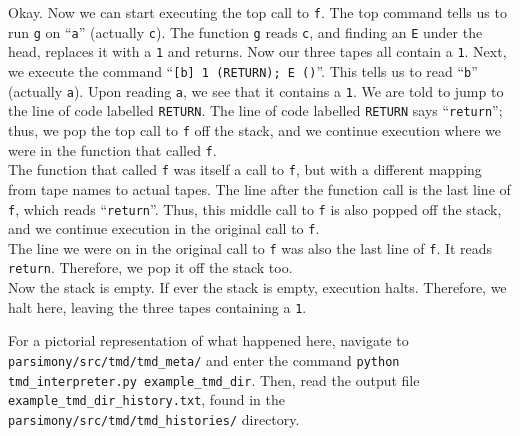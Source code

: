 \documentclass[11pt]{article}
\begin{document}
Okay. Now we can start executing the top call to \texttt{f}. The top command tells us to run \texttt{g} on ``\texttt{a}'' (actually \texttt{c}). The function \texttt{g} reads \texttt{c}, and finding an \texttt{E} under the head, replaces it with a \texttt{1} and returns. Now our three tapes all contain a \texttt{1}. Next, we execute the command ``\texttt{[b] 1 (RETURN); E ()}''. This tells us to read ``\texttt{b}'' (actually \texttt{a}). Upon reading \texttt{a}, we see that it contains a \texttt{1}. We are told to jump to the line of code labelled \texttt{RETURN}. The line of code labelled \texttt{RETURN} says ``\texttt{return}''; thus, we pop the top call to \texttt{f} off the stack, and we continue execution where we were in the function that called \texttt{f}. \\

The function that called \texttt{f} was itself a call to \texttt{f}, but with a different mapping from tape names to actual tapes. The line after the function call is the last line of \texttt{f}, which reads ``\texttt{return}''. Thus, this middle call to \texttt{f} is also popped off the stack, and we continue execution in the original call to \texttt{f}. \\

The line we were on in the original call to \texttt{f} was also the last line of \texttt{f}. It reads \texttt{return}. Therefore, we pop it off the stack too. \\

Now the stack is empty. If ever the stack is empty, execution halts. Therefore, we halt here, leaving the three tapes containing a \texttt{1}.

For a pictorial representation of what happened here, navigate to \texttt{parsimony/src/tmd/tmd\_meta/} and enter the command \texttt{python tmd\_interpreter.py example\_tmd\_dir}. Then, read the output file \texttt{example\_tmd\_dir\_history.txt}, found in the \texttt{parsimony/src/tmd/tmd\_histories/} directory.
\end{document}
